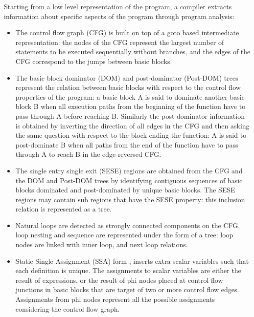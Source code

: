 \documentclass{sigplanconf}
\begin{document}
Starting from a low level representation of the program, a compiler extracts
information about specific aspects of the program through program analysis:

\begin{itemize}
\item The control flow graph (CFG) \cite{dragonbook} is built on top of a goto
  based intermediate representation: the nodes of the CFG represent the largest
  number of statements to be executed sequentially without branches, and the
  edges of the CFG correspond to the jumps between basic blocks.

\item The basic block dominator (DOM) and post-dominator (Post-DOM) trees
  \cite{dragonbook} represent the relation between basic blocks with respect to
  the control flow properties of the program: a basic block A is said to
  dominate another basic block B when all execution paths from the beginning of
  the function have to pass through A before reaching B.  Similarly the post-dominator
  information is obtained by inverting the direction of all edges in the CFG and
  then asking the same question with respect to the block ending the function: A
  is said to post-dominate B when all paths from the end of the function have to
  pass through A to reach B in the edge-reversed CFG.

\item The single entry single exit (SESE) regions \cite{keshav-pingali} are
  obtained from the CFG and the DOM and Post-DOM trees by identifying contiguous
  sequences of basic blocks dominated and post-dominated by unique basic blocks.
  The SESE regions may contain sub regions that have the SESE property: this
  inclusion relation is represented as a tree.

\item Natural loops \cite{dragonbook} are detected as strongly connected
  components \cite{tarjan} on the CFG, loop nesting and sequence are represented
  under the form of a tree: loop nodes are linked with inner loop, and next loop
  relations.

\item Static Single Assignment (SSA) form \cite{zadek}, inserts extra scalar
  variables such that each definition is unique.  The assignments to scalar
  variables are either the result of expressions, or the result of phi nodes
  placed at control flow junctions in basic blocks that are target of two or
  more control flow edges.  Assignments from phi nodes represent all the
  possible assignments considering the control flow graph.


\end{itemize}
\end{document}
